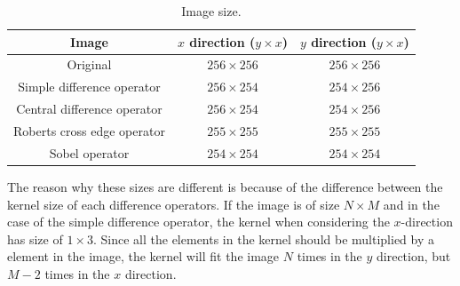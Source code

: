\documentclass[11pt,a4paper]{article}
\begin{document}
\begin{itemize}
			\begin{table}[!ht]
				\centering
				\caption{Image size.}
				\label{tab:Image_Size}
				\begin{tabular}{ccc}
					\hline
					Image & $x$ direction ($y \times x$) & $y$ direction ($y \times x$) \\
					\hline
					Original & $256 \times 256$ & $256 \times 256$ \\
					Simple difference operator & $256 \times 254$ & $254 \times 256$ \\
					Central difference operator & $256 \times 254$ & $254 \times 256$ \\
					Roberts cross edge operator & $255 \times 255$ & $255 \times 255$ \\
					Sobel operator & $254 \times 254$ & $254 \times 254$ \\
					\hline
				\end{tabular}
			\end{table}
			\par The reason why these sizes are different is because of the difference between the kernel size of each difference operators. If the image is of size $N \times M$ and in the case of the simple difference operator, the kernel when considering the $x$-direction has size of $1 \times 3$. Since all the elements in the kernel should be multiplied by a element in the image, the kernel will fit the image $N$ times in the $y$ direction, but $M-2$ times in the $x$ direction.
	\end{itemize}
\end{document}
